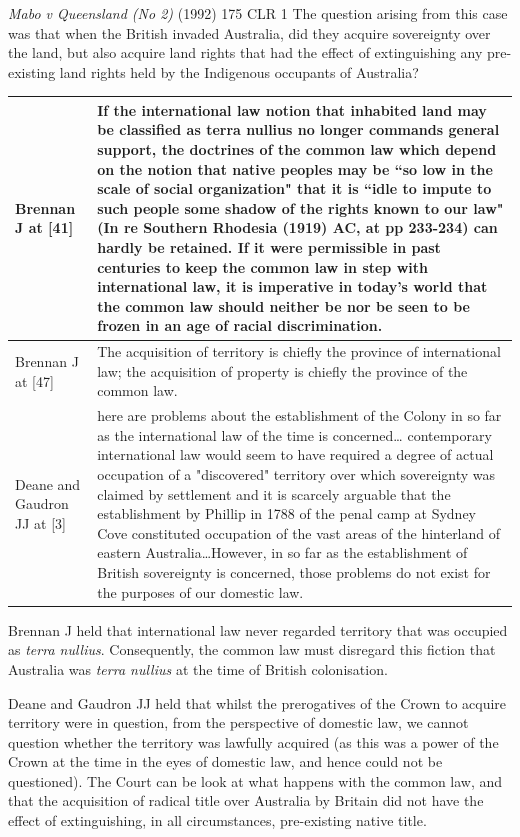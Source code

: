 \begin{casedetails}{\textit{Mabo v Queensland (No 2)} (1992) 175 CLR 1}
    \flushleft
    The question arising from this case was that when the British invaded Australia, did they acquire sovereignty over the land, but also acquire land rights that had the effect of extinguishing any pre-existing land rights held by the Indigenous occupants of Australia?

    \begin{longtable}{p{}|>{\raggedright\arraybackslash}p{}}
        Brennan J at [41] & If the international law notion that inhabited land may be classified as terra nullius no longer commands general support, the doctrines of the common law which depend on the notion that native peoples may be ``so low in the scale of social organization" that it is ``idle to impute to such people some shadow of the rights known to our law" (In re Southern Rhodesia (1919) AC, at pp 233-234) can hardly be retained. If it were permissible in past centuries to keep the common law in step with international law, it is imperative in today's world that the common law should neither be nor be seen to be frozen in an age of racial discrimination. \\\hline
        Brennan J at [47] & The acquisition of territory is chiefly the province of international law; the acquisition of property is chiefly the province of the common law. \\\hline
        Deane and Gaudron JJ at [3] & [T]here are problems about the establishment of the Colony in so far as the international law of the time is concerned… contemporary international law would seem to have required a degree of actual occupation of a "discovered" territory over which sovereignty was claimed by settlement and it is scarcely arguable that the establishment by Phillip in 1788 of the penal camp at Sydney Cove constituted occupation of the vast areas of the hinterland of eastern Australia…However, in so far as the establishment of British sovereignty is concerned, those problems do not exist for the purposes of our domestic law.
    \end{longtable} 

    Brennan J held that international law never regarded territory that was occupied as \textit{terra nullius}. Consequently, the common law must disregard this fiction that Australia was \textit{terra nullius} at the time of British colonisation.

    \vspace{\baselineskip}

    Deane and Gaudron JJ held that whilst the prerogatives of the Crown to acquire territory were in question, from the perspective of domestic law, we cannot question whether the territory was lawfully acquired (as this was a power of the Crown at the time in the eyes of domestic law, and hence could not be questioned). The Court can be look at what happens with the common law, and that the acquisition of radical title over Australia by Britain did not have the effect of extinguishing, in all circumstances, pre-existing native title.
\end{casedetails}

